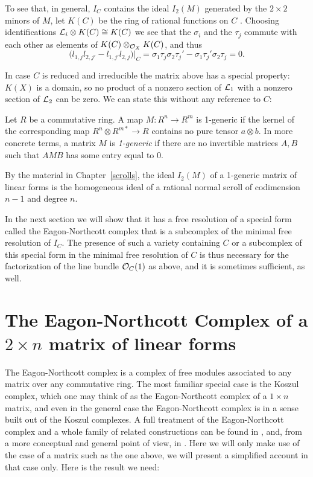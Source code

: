 To see that, in general, $I_C$ contains the ideal $I_2(M)$ generated by the $2\times 2$ minors of $M$, 
let $K(C)$ be the ring of rational functions on $C$ . Choosing identifications ${\mathcal L}_i\otimes K(C) \cong K(C)$ we see that the $\sigma_i$ and the $\tau_j$ commute with each other as elements of $K(C) \otimes_{{\mathcal O}_X} K(C)$, and thus 
$$
\bigl(l_{1,j} l_{2,j'}-l_{1,j'}l_{2,j}\bigr)|_C = \sigma_1\tau_j\sigma_2\tau_j' - \sigma_1\tau_j'\sigma_2\tau_j =0.
$$

In case $C$ is reduced and irreducible the matrix above has a special property: $K(X)$ is a domain, so no product of a nonzero
section of ${\mathcal L}_1$ with a nonzero section of ${\mathcal L}_2$ can be zero. We can state this without any reference to $C$:

\begin{definition}
Let $R$ be a commutative ring. A map $M:R^n\to R^m$ is 1-generic if the kernel of the corresponding
 map $R^{n}\otimes R^{m*} \to R$  contains no pure tensor $a\otimes b$. In more concrete terms, a matrix
$M$ is \emph{1-generic} if there are no invertible matrices $A,B$ such that  $AMB$ has some entry equal to 0.
\end{definition}

By the material in Chapter~\ref{scrolls}, the ideal $I_2(M)$ of a 1-generic matrix of linear forms is the homogeneous ideal of a rational normal 
scroll
of codimension $n-1$ and degree $n$. 

In the next section we will show that it has a free resolution of a special form called the 
Eagon-Northcott complex that is a subcomplex of the minimal free resolution of $I_C$. The presence of such a variety containing $C$ or
a subcomplex of this special form in the minimal free resolution of $C$ is thus necessary for the 
factorization of the line bundle ${\mathcal O}_C(1)$ as above, and it is sometimes sufficient, as well.

\section{The Eagon-Northcott Complex of a $2\times n$ matrix of linear forms}

The Eagon-Northcott complex is a complex of free modules associated to any matrix over any commutative ring. The most familiar special case is the Koszul complex, which one may think of as the Eagon-Northcott complex of a $1\times n$ matrix, and  even in the general case the Eagon-Northcott complex is in a sense built out of the Koszul complexes. A full treatment of the Eagon-Northcott complex and a whole family of related constructions can be found in 
\cite[Appendix ***]{E}, and, from a more conceptual and general point of view, in \cite{Weyman}. Here we will only
make use of the case of a matrix such as the one above, we will present a simplified account in that case only. Here is the result we need:

